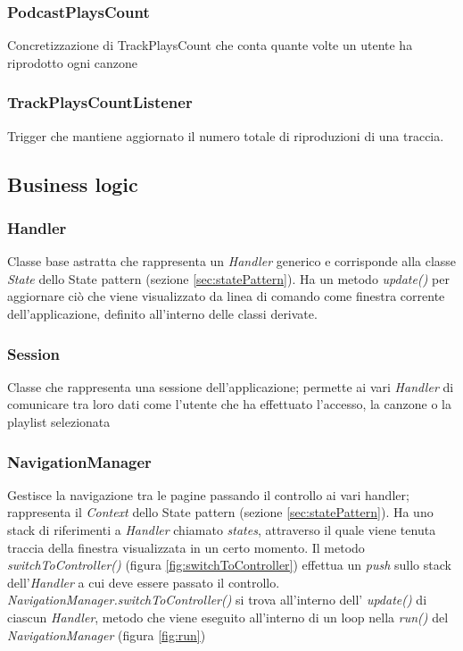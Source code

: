\documentclass{article}
\begin{document}
  \subsubsection{PodcastPlaysCount}
  Concretizzazione di TrackPlaysCount che conta quante volte un utente ha riprodotto ogni canzone

  \subsubsection{TrackPlaysCountListener}
  Trigger che mantiene aggiornato il numero totale di riproduzioni di una traccia.

  \subsection{Business logic}

  \subsubsection{Handler}
  Classe base astratta che rappresenta un \textit{Handler} generico e corrisponde alla classe \textit{State} dello State pattern (sezione \ref{sec:statePattern}). Ha un metodo \textit{update()} per aggiornare ciò che viene visualizzato da linea di comando come finestra corrente dell'applicazione, definito all'interno delle classi derivate.

  \subsubsection{Session}
  Classe che rappresenta una sessione dell'applicazione; permette ai vari \textit{Handler} di comunicare tra loro dati come l'utente che ha effettuato l'accesso, la canzone o la playlist selezionata

  \subsubsection{NavigationManager}
  \label{sec:navManager}
  Gestisce la navigazione tra le pagine passando il controllo ai vari handler; rappresenta il \textit{Context} dello State pattern (sezione \ref{sec:statePattern}). Ha uno stack di riferimenti a \textit{Handler} chiamato \textit{states}, attraverso il quale viene tenuta traccia della finestra visualizzata in un certo momento. Il metodo \textit{switchToController()} (figura \ref{fig:switchToController}) effettua un \textit{push} sullo stack dell'\textit{Handler} a cui deve essere passato il controllo. \textit{NavigationManager.switchToController()} si trova all'interno dell' \textit{update()} di ciascun \textit{Handler}, metodo che viene eseguito all'interno di un loop nella \textit{run()} del \textit{NavigationManager} (figura \ref{fig:run})
\end{document}

